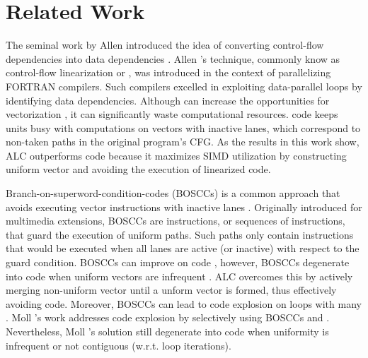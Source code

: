 \section{Related Work}
\label{sec:related-works}

The seminal work by Allen \etal introduced the idea of converting control-flow dependencies into data dependencies \cite{allen_conversion_1983}.
Allen \etal's technique, commonly know as control-flow linearization or \ifconversion \cite{park1991ifconversion}, was introduced in the context of parallelizing FORTRAN compilers.
Such compilers excelled in exploiting data-parallel loops by identifying data dependencies.
Although \ifconversion can increase the opportunities for vectorization \cite{jaewook_shin_superword-level_2005}, it can significantly waste computational resources.
\ifconverted code keeps units busy with computations on vectors with inactive lanes, which correspond to non-taken paths in the original program's CFG.
As the results in this work show, ALC outperforms \ifconverted code because it maximizes SIMD utilization by constructing uniform vector and avoiding the execution of linearized code.

Branch-on-superword-condition-codes (BOSCCs) is a common approach that avoids executing vector instructions with inactive lanes \cite{shin_introducing_2007}.
Originally introduced for multimedia extensions, BOSCCs are instructions, or sequences of instructions, that guard the execution of uniform paths.
Such paths only contain instructions that would be executed when all lanes are active (or inactive) with respect to the guard condition.
BOSCCs can improve on \ifconverted code \cite{shin_evaluating_2009}, however, BOSCCs degenerate into \ifconverted code when uniform vectors are infrequent \cite{praharenka_vectorizing_2022}.
ALC overcomes this by actively merging non-uniform vector until a unform vector is formed, thus effectively avoiding \ifconverted code. 
Moreover, BOSCCs can lead to code explosion on loops with many \cpaths.
Moll \etal's work addresses code explosion by selectively using BOSCCs and \ifconversion \cite{moll_partial_2018}.
Nevertheless, Moll \etal's solution still degenerate into \ifconverted code when uniformity is infrequent or not contiguous (w.r.t. loop iterations).

